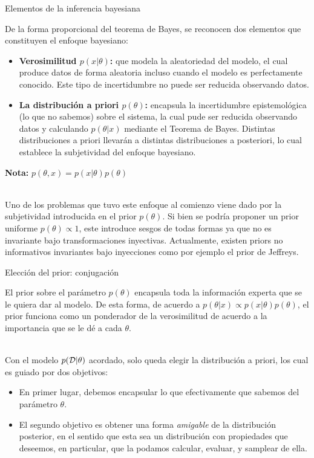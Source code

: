\documentclass[9pt, handout]{beamer}
\begin{document}
\begin{frame}{Elementos de la inferencia bayesiana}

De la forma proporcional del teorema de Bayes, se reconocen dos elementos que constituyen el enfoque bayesiano:

\begin{itemize}
	\setlength\itemsep{1em}
	\item \textbf{Verosimilitud $p(x|\theta)$:} que modela la aleatoriedad del modelo, el cual produce datos de forma aleatoria incluso cuando el modelo es perfectamente conocido. Este tipo de incertidumbre no puede ser reducida observando datos.\pause
	\item \textbf{La distribución a priori $p(\theta)$:}  encapsula la incertidumbre epistemológica (lo que no sabemos) sobre el sistema, la cual pude ser reducida observando datos y calculando $p(\theta|x)$ mediante el Teorema de Bayes. Distintas distribuciones a priori llevarán a distintas distribuciones a posteriori, lo cual establece la subjetividad del enfoque bayesiano.\pause
\end{itemize}
\vspace{1em}
\textbf{Nota:} $p(\theta, x) = p(x|\theta)p(\theta)$\\~\

Uno de los problemas que tuvo este enfoque al comienzo viene dado por la subjetividad introducida en el prior $p(\theta)$. Si bien se podría proponer un prior uniforme $p(\theta)\propto 1$, este introduce sesgos de todas formas ya que no es invariante bajo transformaciones inyectivas. Actualmente, existen priors no informativos invariantes bajo inyecciones como por ejemplo el prior de Jeffreys.
	
\end{frame}

\begin{frame}{Elección del prior: conjugación}

El prior sobre el parámetro $p(\theta)$ encapsula toda la información experta que se le quiera dar al modelo. De esta forma, de acuerdo a $p(\theta|x) \propto p(x|\theta)p(\theta)$, el prior funciona como un ponderador de la verosimilitud de acuerdo a la importancia que se le dé a cada $\theta$. \\~\ \pause

Con el modelo $p({\mathcal D}|\theta)$ acordado, solo  queda elegir la distribución a priori, los cual es guiado por dos objetivos:\pause

\begin{itemize}
	\item  En primer lugar, debemos encapsular lo que efectivamente que sabemos del parámetro $\theta$.\pause
	\item  El segundo objetivo es obtener una forma \emph{amigable} de la distribución posterior, en el sentido que esta sea un distribución con propiedades que deseemos, en particular, que la podamos calcular, evaluar, y samplear de ella.
	
\end{itemize}

\end{frame}
\end{document}
